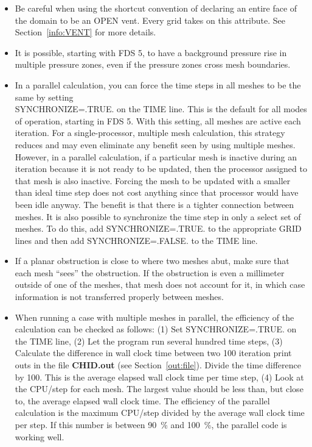 \documentclass[11pt]{book}
\begin{document}
\begin{itemize}
\item Be careful when using the shortcut convention of declaring an
entire face of the domain to be an {\ct OPEN} vent. Every grid
takes on this attribute. See Section~\ref{info:VENT} for more details.
\item It is possible, starting with FDS 5, to have a background pressure rise in multiple pressure zones,
even if the pressure zones
cross mesh boundaries.
\item In a parallel calculation, you can force the time steps in all meshes to
be the same by setting \\
{\ct SYNCHRONIZE=.TRUE.} on the {\ct TIME} line.
This is the default for all modes of operation, starting in FDS 5. With this
setting, all meshes are active each iteration. For a single-processor, multiple mesh
calculation, this strategy reduces
and may even eliminate any benefit seen by using multiple meshes. However, in a
parallel calculation, if a particular mesh is inactive during an iteration because
it is not ready to be updated, then the processor assigned to that mesh is also
inactive. Forcing the mesh to be updated with a smaller than ideal time step does not
cost anything since that processor would have been idle anyway. The benefit is that
there is a tighter connection between meshes.
It is also possible to synchronize the time step in only a select set of meshes. To do
this, add {\ct SYNCHRONIZE=.TRUE.} to the appropriate {\ct GRID} lines and then add
{\ct SYNCHRONIZE=.FALSE.} to the {\ct TIME} line.
\item If a planar obstruction is close to where two meshes abut, make sure that each
mesh ``sees'' the obstruction. If the obstruction is even a millimeter outside of one
of the meshes, that mesh does not account for it, in which case information is not
transferred properly between meshes.
\item When running a case with multiple meshes in parallel, the efficiency of the
calculation can be checked as follows: (1) Set {\ct SYNCHRONIZE=.TRUE.} on the
{\ct TIME} line, (2) Let the program run several hundred time steps, (3) Calculate
the difference in wall clock time between two 100 iteration print outs in
the file {\bf CHID.out} (see Section~\ref{out:file}).
Divide the time difference by 100. This is the average
elapsed wall clock time per time step, (4) Look at the {\ct CPU/step} for each mesh. The
largest value should be less than, but close to, the average elapsed wall clock time.
The efficiency of the parallel calculation is the maximum {\ct CPU/step} divided by
the average wall clock time per step. If this number is between 90~\% and 100~\%, the
parallel code is working well.
\end{itemize}
\end{document}
